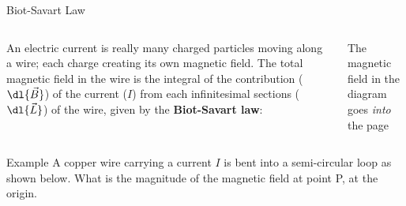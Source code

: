 \documentclass[12pt,aspectratio=169]{beamer}
\begin{document}
\begin{frame}{Biot-Savart Law}
  \begin{columns}
    
    An electric current is really many charged particles moving along a wire;
    each charge creating its own magnetic field.
    The total magnetic field in the wire is the integral of the contribution
    ($\dl{\vec B}$) of the current ($I$) from each infinitesimal sections
    ($\dl{\vec L}$) of the wire, given by the \textbf{Biot-Savart law}:
  

    The magnetic field in the diagram goes \emph{into} the page
  \end{columns}
\end{frame}



\begin{frame}{Example}
  A copper wire carrying a current $I$ is bent into a semi-circular loop as
  shown below. What is the magnitude of the magnetic field at point P, at the
  origin.
  
\end{frame}
\end{document}
